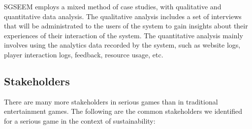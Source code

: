 \documentclass{sigchi}
\begin{document}

SGSEEM employs a mixed method of case studies, with qualitative and
quantitative data analysis. The qualitative analysis includes a set of
interviews that will be administrated to the users of the system to
gain insights about their experiences of their interaction of the
system. The quantitative analysis mainly involves using the analytics
data recorded by the system, such as website logs, player interaction
logs, feedback, resource usage, etc.


\subsection{Stakeholders}


There are many more stakeholders in serious games than in traditional entertainment
games. The following are the common stakeholders we identified for a serious game in the
context of sustainability:
\end{document}
